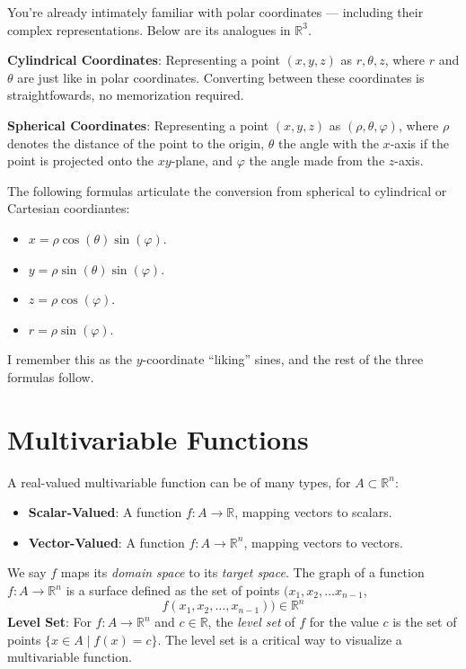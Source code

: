 \documentclass[11pt]{article}
\begin{document}
You're already intimately familiar with polar coordinates --- including their complex representations. Below are its analogues in $\mathbb{R}^{3}$.

\textbf{Cylindrical Coordinates}: Representing a point $(x, y, z)$ as $r, \theta, z$, where $r$ and $\theta$ are just like in polar coordinates. Converting between these coordinates is straightfowards, no memorization required.

\textbf{Spherical Coordinates}: Representing a point $(x, y, z)$ as $(\rho, \theta, \varphi)$, where $\rho$ denotes the distance of the point to the origin, $\theta$ the angle with the $x$-axis if the point is projected onto the $xy$-plane, and $\varphi$ the angle made from the $z$-axis.

The following formulas articulate the conversion from spherical to cylindrical or Cartesian coordiantes:

\begin{itemize}
	\item $x = \rho \cos(\theta) \sin(\varphi)$.
	\item $y = \rho \sin(\theta) \sin(\varphi)$.
	\item $z = \rho \cos(\varphi)$.
	\item $r = \rho \sin(\varphi)$.
\end{itemize}

I remember this as the $y$-coordinate ``liking'' sines, and the rest of the three formulas follow.


\section{Multivariable Functions}

A real-valued multivariable function can be of many types, for $A \subset \mathbb{R}^{n}$:
\begin{itemize}
	\item \textbf{Scalar-Valued}: A function $f: A \to \mathbb{R}$, mapping vectors to scalars.
	\item \textbf{Vector-Valued}: A function $f: A \to \mathbb{R}^{n}$, mapping vectors to vectors.
\end{itemize}
We say $f$ maps its \textit{domain space} to its \textit{target space}. The graph of a function $f: A \to \mathbb{R}^{n}$ is a surface defined as the set of points $(x_{1}, x_{2}, \ldots x_{n-1}$, 
\[
	f(x_{1}, x_{2}, \ldots, x_{n-1})) \in \mathbb{R}^{n}
\]
\textbf{Level Set}: For $f: A \to \mathbb{R}^{n}$ and $c \in \mathbb{R}$, the \textit{level set} of $f$ for the value $c$ is the set of points $\{ x \in A \mid f(x) = c \}$. The level set is a critical way to visualize a multivariable function.

\end{document}
